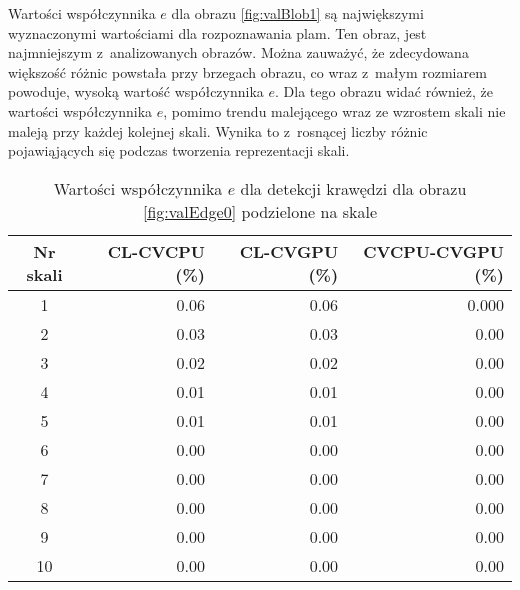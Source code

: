 Wartości współczynnika $ e $ dla obrazu \ref{fig:valBlob1} są największymi wyznaczonymi wartościami dla rozpoznawania plam. Ten obraz, jest najmniejszym z~analizowanych obrazów. Można zauważyć, że zdecydowana większość różnic powstała przy brzegach obrazu, co wraz z~małym rozmiarem powoduje, wysoką wartość współczynnika $ e $. Dla tego obrazu widać również, że wartości współczynnika $ e $, pomimo trendu malejącego wraz ze wzrostem skali nie maleją przy każdej kolejnej skali. Wynika to z~rosnącej liczby różnic pojawiąjących się podczas tworzenia reprezentacji skali.

\begin{center}
\begin{table}
\centering
\caption{Wartości współczynnika $ e $ dla detekcji krawędzi dla obrazu \ref{fig:valEdge0} podzielone na skale}
\label{tab:imageScaleEdge0}
\begin{tabular}{|c|r|r|r|}
 \hline
Nr skali & CL-CVCPU (\%) & CL-CVGPU (\%) & CVCPU-CVGPU (\%) \\ \hline
1        & 0.06     & 0.06     & 0.000       \\ \hline
2        & 0.03     & 0.03     & 0.00        \\ \hline
3        & 0.02     & 0.02     & 0.00        \\ \hline
4        & 0.01     & 0.01     & 0.00        \\ \hline
5        & 0.01     & 0.01     & 0.00        \\ \hline
6        & 0.00     & 0.00     & 0.00        \\ \hline
7        & 0.00     & 0.00     & 0.00        \\ \hline
8        & 0.00     & 0.00     & 0.00        \\ \hline
9        & 0.00     & 0.00     & 0.00        \\ \hline
10       & 0.00     & 0.00     & 0.00        \\ \hline
\end{tabular}
\end{table}
\end{center}

